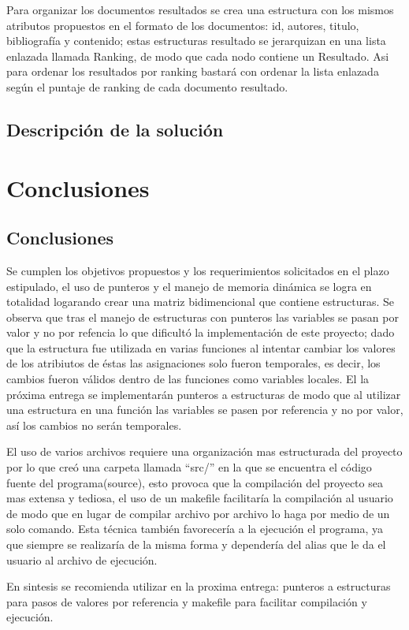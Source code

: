 \documentclass[letterpaper,12pt]{report}
\begin{document}
Para organizar los documentos resultados se crea una estructura con los mismos atributos propuestos en el formato de los documentos: id, autores, titulo, bibliografía y contenido; estas estructuras resultado se jerarquizan en una lista enlazada llamada Ranking, de modo que cada nodo contiene un Resultado. Asi para ordenar los resultados por ranking bastará con ordenar la lista enlazada según el puntaje de ranking de cada documento resultado.

\section {Descripción de la solución}

\chapter{Conclusiones}

\section {Conclusiones}

Se cumplen los objetivos propuestos y los requerimientos solicitados en el plazo estipulado, el uso de punteros y el manejo de memoria dinámica se logra en totalidad logarando crear una matriz bidimencional que contiene estructuras. Se observa que tras el manejo de estructuras con punteros las variables se pasan por valor y no por refencia lo que dificultó la implementación de este proyecto; dado que la estructura fue utilizada en varias funciones al intentar cambiar los valores de los atribiutos de éstas las asignaciones solo fueron temporales, es decir, los cambios fueron válidos dentro de las funciones como variables locales. El la próxima entrega se implementarán punteros a estructuras de modo que al utilizar una estructura en una función las variables se pasen por referencia y no por valor, así los cambios no serán temporales.

El uso de varios archivos requiere una organización mas estructurada del proyecto por lo que creó una carpeta llamada ``src/'' en la que se encuentra el código fuente del programa(source), esto provoca que la compilación del proyecto sea mas extensa y tediosa, el uso de un makefile facilitaría la compilación al usuario de modo que en lugar de compilar archivo por archivo lo haga por medio de un solo comando. Esta técnica también favorecería a la ejecución el programa, ya que siempre se realizaría de la misma forma y dependería del alias que le da el usuario al archivo de ejecución.

En sintesis se recomienda utilizar en la proxima entrega: punteros a estructuras para pasos de valores por referencia y makefile para facilitar compilación y ejecución.
\end{document}
